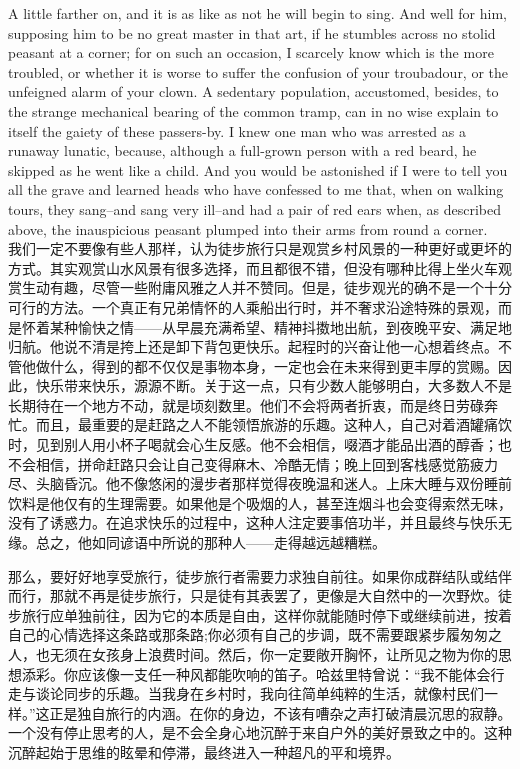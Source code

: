 {A little farther on, and it is as like as not he will begin to sing. And well for him, supposing him to be no great master in that art, if he stumbles across no stolid peasant at a corner; for on such an occasion, I scarcely know which is the more troubled, or whether it is worse to suffer the confusion of your troubadour, or the unfeigned alarm of your clown. A sedentary population, accustomed, besides, to the strange mechanical bearing of the common tramp, can in no wise explain to itself the gaiety of these passers-by. I knew one man who was arrested as a runaway lunatic, because, although a full-grown person with a red beard, he skipped as he went like a child. And you would be astonished if I were to tell you all the grave and learned heads who have confessed to me that, when on walking tours, they sang--and sang very ill--and had a pair of red ears when, as described above, the inauspicious peasant plumped into their arms from round a corner.
\\


我们一定不要像有些人那样，认为徒步旅行只是观赏乡村风景的一种更好或更坏的方式。其实观赏山水风景有很多选择，而且都很不错，但没有哪种比得上坐火车观赏生动有趣，尽管一些附庸风雅之人并不赞同。但是，徒步观光的确不是一个十分可行的方法。一个真正有兄弟情怀的人乘船出行时，并不奢求沿途特殊的景观，而是怀着某种愉快之情——从早晨充满希望、精神抖擞地出航，到夜晚平安、满足地归航。他说不清是挎上还是卸下背包更快乐。起程时的兴奋让他一心想着终点。不管他做什么，得到的都不仅仅是事物本身，一定也会在未来得到更丰厚的赏赐。因此，快乐带来快乐，源源不断。关于这一点，只有少数人能够明白，大多数人不是长期待在一个地方不动，就是顷刻数里。他们不会将两者折衷，而是终日劳碌奔忙。而且，最重要的是赶路之人不能领悟旅游的乐趣。这种人，自己对着酒罐痛饮时，见到别人用小杯子喝就会心生反感。他不会相信，啜酒才能品出酒的醇香；也不会相信，拼命赶路只会让自己变得麻木、冷酷无情；晚上回到客栈感觉筋疲力尽、头脑昏沉。他不像悠闲的漫步者那样觉得夜晚温和迷人。上床大睡与双份睡前饮料是他仅有的生理需要。如果他是个吸烟的人，甚至连烟斗也会变得索然无味，没有了诱惑力。在追求快乐的过程中，这种人注定要事倍功半，并且最终与快乐无缘。总之，他如同谚语中所说的那种人——走得越远越糟糕。

那么，要好好地享受旅行，徒步旅行者需要力求独自前往。如果你成群结队或结伴而行，那就不再是徒步旅行，只是徒有其表罢了，更像是大自然中的一次野炊。徒步旅行应单独前往，因为它的本质是自由，这样你就能随时停下或继续前进，按着自己的心情选择这条路或那条路;你必须有自己的步调，既不需要跟紧步履匆匆之人，也无须在女孩身上浪费时间。然后，你一定要敞开胸怀，让所见之物为你的思想添彩。你应该像一支任一种风都能吹响的笛子。哈兹里特曾说：“我不能体会行走与谈论同步的乐趣。当我身在乡村时，我向往简单纯粹的生活，就像村民们一样。”这正是独自旅行的内涵。在你的身边，不该有嘈杂之声打破清晨沉思的寂静。一个没有停止思考的人，是不会全身心地沉醉于来自户外的美好景致之中的。这种沉醉起始于思维的眩晕和停滞，最终进入一种超凡的平和境界。

}
